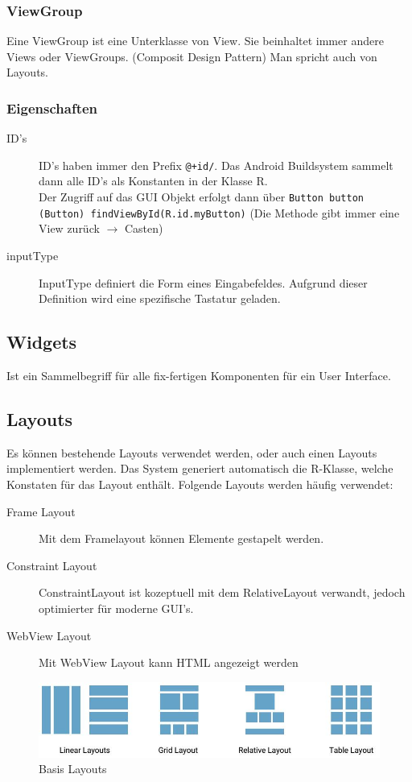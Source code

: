 \subsubsection{ViewGroup}
Eine ViewGroup ist eine Unterklasse von View. Sie beinhaltet immer andere Views oder ViewGroups. (Composit Design Pattern) Man spricht auch von Layouts.

\subsubsection{Eigenschaften}
\begin{description}
	\item[ID's] ID's haben immer den Prefix \lstinline|@+id/|. Das Android Buildsystem sammelt dann alle ID's als Konstanten in der Klasse R. \\
	Der Zugriff auf das GUI Objekt erfolgt dann über \lstinline|Button button (Button) findViewById(R.id.myButton)| (Die Methode gibt immer eine View zurück $\rightarrow$ Casten)
	\item[inputType] InputType definiert die Form eines Eingabefeldes. Aufgrund dieser Definition wird eine spezifische Tastatur geladen.
\end{description}

\subsection{Widgets}
Ist ein Sammelbegriff für alle fix-fertigen Komponenten für ein User Interface. 

\subsection{Layouts}
Es können bestehende Layouts verwendet werden, oder auch einen Layouts implementiert werden. Das System generiert automatisch die R-Klasse, welche Konstaten für das Layout enthält. Folgende Layouts werden häufig verwendet:
\begin{description}
	\item[Frame Layout] Mit dem Framelayout können Elemente gestapelt werden. 
	\item[Constraint Layout] ConstraintLayout ist kozeptuell mit dem RelativeLayout verwandt, jedoch optimierter für moderne GUI's.
	\item[WebView Layout] Mit WebView Layout kann HTML angezeigt werden
\end{description}
\begin{figure}[h]
	\centering
	\includegraphics[width=0.7\linewidth]{images/base_layouts}
	\caption{Basis Layouts}
	\label{fig:baselayouts}
\end{figure}

